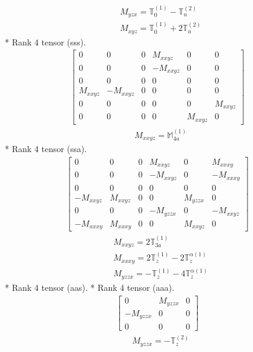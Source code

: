 \documentclass[fleqn,8pt,landscape]{jsarticle}
\begin{document}
\begin{align*}
& M_{yzx} = \mathbb{T}_{0}^{(1)} - \mathbb{T}_{u}^{(2)} \\
& M_{xyz} = \mathbb{T}_{0}^{(1)} + 2 \mathbb{T}_{u}^{(2)}
\end{align*}
* Rank 4 tensor (sss).
\begin{align*}
\begin{bmatrix} 0 & 0 & 0 & M_{xxyz} & 0 & 0 \\ 0 & 0 & 0 & - M_{xxyz} & 0 & 0 \\ 0 & 0 & 0 & 0 & 0 & 0 \\ M_{xxyz} & - M_{xxyz} & 0 & 0 & 0 & 0 \\ 0 & 0 & 0 & 0 & 0 & M_{xxyz} \\ 0 & 0 & 0 & 0 & M_{xxyz} & 0 \end{bmatrix}
\end{align*}
\begin{align*}
& M_{xxyz} = \mathbb{M}_{4a}^{(1)}
\end{align*}
* Rank 4 tensor (ssa).
\begin{align*}
\begin{bmatrix} 0 & 0 & 0 & M_{xxyz} & 0 & M_{xxxy} \\ 0 & 0 & 0 & - M_{xxyz} & 0 & - M_{xxxy} \\ 0 & 0 & 0 & 0 & 0 & 0 \\ - M_{xxyz} & M_{xxyz} & 0 & 0 & M_{yzzx} & 0 \\ 0 & 0 & 0 & - M_{yzzx} & 0 & - M_{xxyz} \\ - M_{xxxy} & M_{xxxy} & 0 & 0 & M_{xxyz} & 0 \end{bmatrix}
\end{align*}
\begin{align*}
& M_{xxyz} = 2 \mathbb{T}_{3a}^{(1)} \\
& M_{xxxy} = 2 \mathbb{T}_{z}^{(1)} - 2 \mathbb{T}_{z}^{\alpha(1)} \\
& M_{yzzx} = - \mathbb{T}_{z}^{(1)} - 4 \mathbb{T}_{z}^{\alpha(1)}
\end{align*}
* Rank 4 tensor (aas).
* Rank 4 tensor (aaa).
\begin{align*}
\begin{bmatrix} 0 & M_{yzzx} & 0 \\ - M_{yzzx} & 0 & 0 \\ 0 & 0 & 0 \end{bmatrix}
\end{align*}
\begin{align*}
& M_{yzzx} = - \mathbb{T}_{z}^{(2)}
\end{align*}
\end{document}
